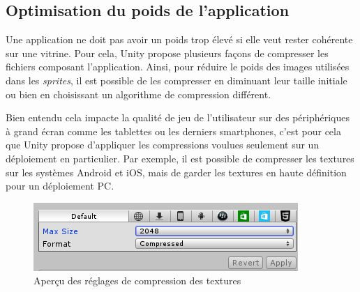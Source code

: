 \subsection{Optimisation du poids de l'application}

Une application ne doit pas avoir un poids trop élevé si elle veut rester cohérente sur une vitrine.  Pour cela, Unity propose plusieurs façons de compresser les fichiers composant l'application. Ainsi, pour réduire le poids des images utilisées dans les \textit{sprites}, il est possible de les compresser en diminuant leur taille initiale ou bien en choisissant un algorithme de compression différent.

Bien entendu cela impacte la qualité de jeu de l'utilisateur sur des périphériques à grand écran comme les tablettes ou les derniers smartphones, c'est pour cela que Unity propose d'appliquer les compressions voulues seulement sur un déploiement en particulier. Par exemple, il est possible de compresser les textures sur les systèmes Android et iOS, mais de garder les textures en haute définition pour un déploiement PC.


\begin{figure}[H]\centering
  \includegraphics[scale=1]{./img/optimisation_poids.png}
  \caption{Aperçu des réglages de compression des textures}
  \label{optimisation_poids}
\end{figure}

